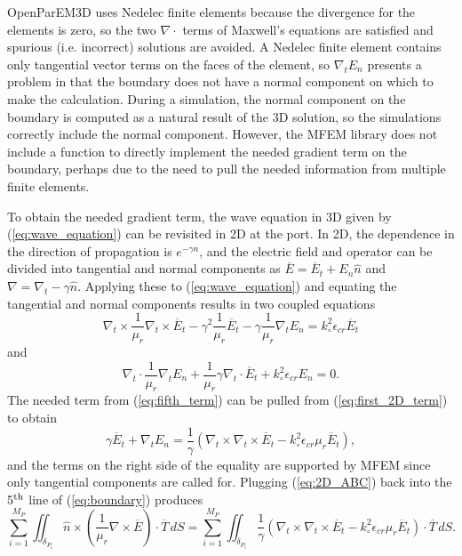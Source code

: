 \documentclass[titlepage]{article}
\renewcommand\_{\textunderscore\linebreak[1]}
\begin{document}
OpenParEM3D uses Nedelec finite elements because the divergence for the elements is zero, so the two $\nabla\cdot$ terms of Maxwell's equations are satisfied and spurious (i.e. incorrect) solutions are avoided.  A Nedelec finite element contains only tangential vector terms on the faces of the element, so $\nabla_t E_n$ presents a problem in that the boundary does not have a normal component on which to make the calculation.  During a simulation, the normal component on the boundary is computed as a natural result of the 3D solution, so the simulations correctly include the normal component.  However, the MFEM library does not include a function to directly implement the needed gradient term on the boundary, perhaps due to the need to pull the needed information from multiple finite elements.

To obtain the needed gradient term, the wave equation in 3D given by (\ref{eq:wave_equation}) can be revisited in 2D at the port.  In 2D, the dependence in the direction of propagation is $e^{-\gamma n}$, and the electric field and operator can be divided into tangential and normal components as $\overline{E}=\overline{E}_t + E_n \hat{n}$ and $\nabla=\nabla_t - \gamma \hat{n}$. Applying these to (\ref{eq:wave_equation}) and equating the tangential and normal components results in two coupled equations
\begin{equation}
\label{eq:first_2D_term}
\nabla_t\times\frac{1}{\mu_r}\nabla_t\times\overline{E}_t-\gamma^2\frac{1}{\mu_r}\overline{E}_t-\gamma\frac{1}{\mu_r}\nabla_t E_n=k_{\circ}^2 \epsilon_{cr}\overline{E}_t
\end{equation}
and
\begin{equation}
\label{eq:second_2D_term}
\nabla_t\cdot\frac{1}{\mu_r}\nabla_t E_n+\frac{1}{\mu_r}\gamma\nabla_t\cdot\overline{E}_t+k_{\circ}^2\epsilon_{cr}E_n=0.
\end{equation}
The needed term from (\ref{eq:fifth_term}) can be pulled from (\ref{eq:first_2D_term}) to obtain
\begin{equation}
\label{eq:2D_ABC}
\gamma \overline{E}_t + \nabla_t E_n=\frac{1}{\gamma}(\nabla_t \times \nabla_t \times \overline{E}_t - k_{\circ}^2 \epsilon_{cr}\mu_r \overline{E}_t),
\end{equation}
and the terms on the right side of the equality are supported by MFEM since only tangential components are called for.  Plugging (\ref{eq:2D_ABC}) back into the 5$^{\textnormal{th}}$ line of (\ref{eq:boundary}) produces
\begin{equation}
\label{eq:fifth_term_final}
\sum_{i=1}^{M_P}\iint_{\delta_{P_{i}}}\hat{n}\times(\frac{1}{\mu_r}\nabla\times\overline{E})\cdot\overline{T}\,dS=\sum_{i=1}^{M_P}\iint_{\delta_{P_{i}}}\frac{1}{\gamma}(\nabla_t \times \nabla_t \times \overline{E}_t - k_{\circ}^2 \epsilon_{cr}\mu_r \overline{E}_t)\cdot\overline{T}\,dS.
\end{equation}
\end{document}
